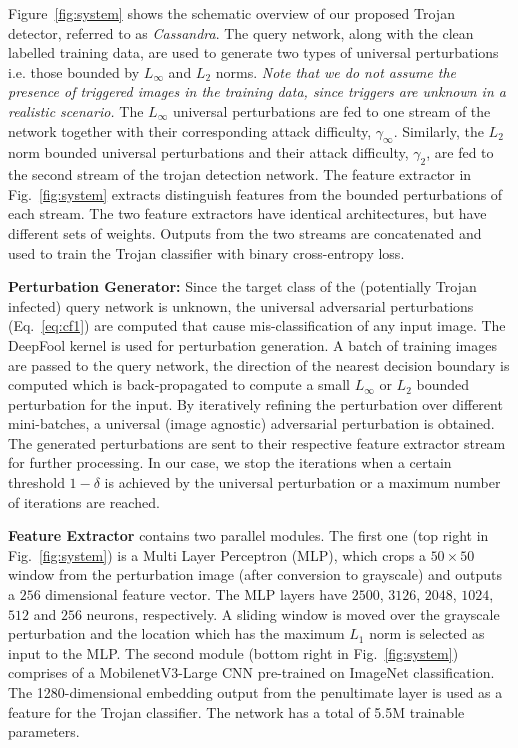 \documentclass{article}
\begin{document}
Figure~\ref{fig:system} shows the schematic overview of our proposed Trojan detector, referred to as \textit{Cassandra}. The query network, along with the clean labelled training data, are used to generate two types of universal perturbations i.e. those bounded by $L_\infty$ and $L_2$ norms. {\it Note that we do not assume the presence of triggered images in the training data,  since triggers are unknown in a realistic scenario. }
The $L_\infty$ universal perturbations are fed to one stream of the network together with their corresponding attack difficulty, $\gamma_\infty$. Similarly, the $L_2$ norm bounded universal perturbations and their attack difficulty, $\gamma_2$, are fed to the second stream of the trojan detection network. The feature extractor in Fig.~\ref{fig:system} extracts distinguish features from the bounded perturbations of each stream. The two feature extractors have identical architectures, but have different sets of weights. Outputs from the two streams are concatenated and used to train the Trojan classifier with binary cross-entropy loss.









\textbf{Perturbation Generator:} Since the target class of the (potentially Trojan infected) query network is unknown, the  universal adversarial perturbations (Eq.~\ref{eq:cf1}) \cite{moosavi2017universal} are computed  that cause mis-classification of any input image. The DeepFool \cite{moosavi2016deepfool} kernel is used  for perturbation generation. A batch of training images are passed to the query network, the direction of the nearest decision boundary is computed which is back-propagated to compute a small $L_\infty$ or $L_2$ bounded perturbation for the input. By iteratively refining the perturbation over different mini-batches, a universal (image agnostic) adversarial perturbation is obtained. The generated perturbations are sent to their respective feature extractor stream for further processing. In our case, we stop the iterations when a certain threshold $1 - \delta$ is achieved by the universal perturbation or a maximum number of iterations are reached.






\textbf{Feature Extractor} contains two parallel modules. The first one (top right in Fig.~\ref{fig:system}) is a Multi Layer Perceptron (MLP), which crops a $50\times 50$ window from the perturbation image (after conversion to grayscale) and outputs a $256$ dimensional feature vector. The MLP layers have $2500$, $3126$, $2048$, $1024$,  $512$ and $256$ neurons, respectively. 
A sliding window is moved over the grayscale perturbation and the location which has the maximum $L_1$ norm is selected as input to the MLP. The second module (bottom right in Fig.~\ref{fig:system}) comprises of a MobilenetV3-Large CNN \cite{howard2019searching} pre-trained on ImageNet classification. The 1280-dimensional embedding output from the penultimate layer is used as a feature for the Trojan classifier. The network has a total of 5.5M trainable parameters. 
\end{document}

